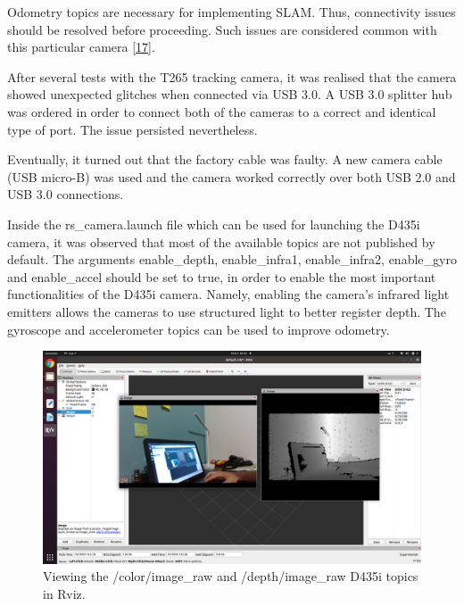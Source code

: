 \documentclass{article}
\begin{document}
Odometry topics are necessary for implementing SLAM. Thus, connectivity issues should be resolved before proceeding. Such issues are considered common with this particular camera \href{https://support.intelrealsense.com/hc/en-us/community/posts/360033359193-T265-Device-not-detected}{[17]}.

After several tests with the T265 tracking camera, it was realised that the camera showed unexpected glitches when connected via USB 3.0. A USB 3.0 splitter hub was ordered in order to connect both of the cameras to a correct and identical type of port. The issue persisted nevertheless. 

Eventually, it turned out that the factory cable was faulty. A  new camera cable (USB micro-B) was used and the camera worked correctly over both USB 2.0 and USB 3.0 connections.

Inside the rs\_camera.launch file which can be used for launching the D435i camera, it was observed that most of the available topics are not published by default. The arguments enable\_depth, enable\_infra1, enable\_infra2, enable\_gyro and enable\_accel should be set to true, in order to enable the most important functionalities of the D435i camera. Namely, enabling the camera's infrared light emitters allows the cameras to use structured light to better register depth. The gyroscope and accelerometer topics can be used to improve odometry.

\begin{figure}[h] %
    \centering
	\includegraphics[width=\textwidth,height=\textheight,keepaspectratio]{report1-img008.png} %
	\caption{Viewing the /color/image\_raw and /depth/image\_raw D435i topics in Rviz.}
\end{figure}
\end{document}
